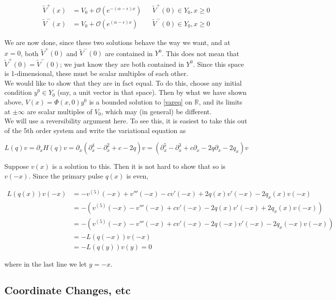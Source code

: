 \documentclass[12pt]{article}
\def\R{{\mathbb R}}
\begin{document}
\begin{align*}
\tilde{V}^+(x) &= V_0 + \mathcal{O}(e^{-(\alpha - \epsilon)x}) && \tilde{V}^+(0) \in Y_0, x \geq 0 \\
\tilde{V}^-(x) &= V_0 + \mathcal{O}(e^{(\alpha - \epsilon)x}) && \tilde{V}^-(0) \in Y_0, x \geq 0
\end{align*}

We are now done, since these two solutions behave the way we want, and at $x = 0$, both $\tilde{V}^+(0)$ and $\tilde{V}^-(0)$ are contained in $Y^0$. This does not mean that $\tilde{V}^+(0) = \tilde{V}^-(0)$; we just know they are both contained in $Y^0$. Since this space is 1-dimensional, these must be scalar multiples of each other.\\

We would like to show that they are in fact equal. To do this, choose any initial condition $y^0 \in Y_0$ (say, a unit vector in that space). Then by what we have shown above, $V(x) = \Phi(x, 0)y^0$ is a bounded solution to \eqref{vareq} on $\R$, and its limits at $\pm \infty$ are scalar multiples of $V_0$, which may (in general) be different.\\

We will use a reversibility argument here. To see this, it is easiest to take this out of the 5th order system and write the variational equation as

\[
L(q)v = \partial_x H(q)v = \partial_x ( \partial_x^4 - \partial_x^2 + c - 2 q)v = 
(\partial_x^5 - \partial_x^3 + c \partial_x - 2 q \partial_x - 2 q_x)v
\]

Suppose $v(x)$ is a solution to this. Then it is not hard to show that so is $v(-x)$. Since the primary pulse $q(x)$ is even,

\begin{align*}
L(q(x))v(-x) &= -v^{(5)}(-x) + v'''(-x) - c v'(-x) + 2 q(x)v'(-x) - 2 q_x(x)v(-x) \\
&= -( v^{(5)}(-x) - v'''(-x) + c v'(-x) - 2 q(x)v'(-x) + 2 q_x(x)v(-x) ) \\
&= -( v^{(5)}(-x) - v'''(-x) + c v'(-x) - 2 q(-x)v'(-x) - 2 q_x(-x)v(-x) ) \\
&= -L(q(-x))v(-x) \\
&= -L(q(y))v(y) = 0
\end{align*}

where in the last line we let $y = -x$. 




\subsection{Coordinate Changes, etc}
\end{document}
